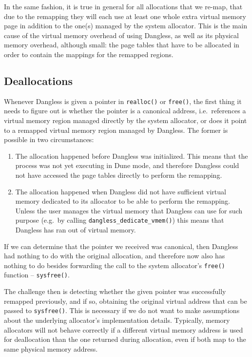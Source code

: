 In the same fashion, it is true in general for all allocations that we re-map, that due to the remapping they will each use at least one whole extra virtual memory page in addition to the one(s) managed by the system allocator. This is the main cause of the virtual memory overhead of using Dangless, as well as its physical memory overhead, although small: the page tables that have to be allocated in order to contain the mappings for the remapped regions.

\subsection{Deallocations}
\label{ssec:deallocations}

Whenever Dangless is given a pointer in \lstinline!realloc()! or \lstinline!free()!, the first thing it needs to figure out is whether the pointer is a canonical address, i.e.\ references a virtual memory region managed directly by the system allocator, or does it point to a remapped virtual memory region managed by Dangless. The former is possible in two circumstances:

\begin{enumerate}
	\item The allocation happened before Dangless was initialized. This means that the process was not yet executing in Dune mode, and therefore Dangless could not have accessed the page tables directly to perform the remapping.
	\item The allocation happened when Dangless did not have sufficient virtual memory dedicated to its allocator to be able to perform the remapping. Unless the user manages the virtual memory that Dangless can use for such purpose (e.g.\ by calling \lstinline!dangless_dedicate_vmem()!) this means that Dangless has ran out of virtual memory.
\end{enumerate}

If we can determine that the pointer we received was canonical, then Dangless had nothing to do with the original allocation, and therefore now also has nothing to do besides forwarding the call to the system allocator's \lstinline!free()! function -- \lstinline!sysfree()!.

The challenge then is detecting whether the given pointer was successfully remapped previously, and if so, obtaining the original virtual address that can be passed to \lstinline!sysfree()!.
This is necessary if we do not want to make assumptions about the underlying allocator's implementation details. Typically, memory allocators will not behave correctly if a different virtual memory address is used for deallocation than the one returned during allocation, even if both map to the same physical memory address.


